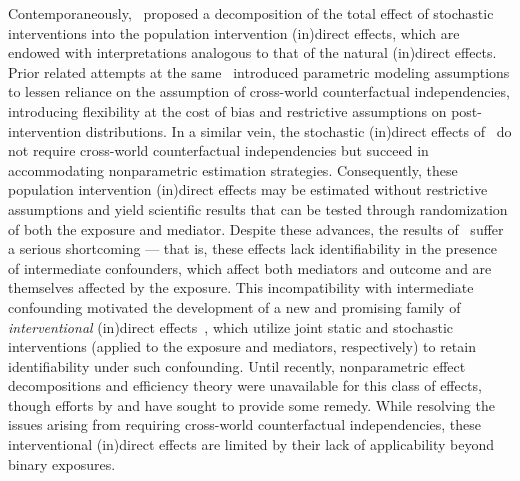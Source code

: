 Contemporaneously,~\citet{diaz2020causal} proposed a decomposition of the total
effect of stochastic interventions into the population intervention (in)direct
effects, which are endowed with interpretations analogous to that of the natural
(in)direct effects. Prior related attempts at the
same~\citep[e.g.,][]{vansteelandt2012imputation} introduced parametric modeling
assumptions to lessen reliance on the assumption of cross-world counterfactual
independencies, introducing flexibility at the cost of bias and restrictive
assumptions on post-intervention distributions. In a similar vein, the
stochastic (in)direct effects of~\citet{diaz2020causal} do not require
cross-world counterfactual independencies but succeed in accommodating
nonparametric estimation strategies. Consequently, these population intervention
(in)direct effects may be estimated without restrictive assumptions and yield
scientific results that can be tested through randomization of both the
exposure and mediator. Despite these advances, the results
of~\citet{diaz2020causal} suffer a serious shortcoming --- that is, these
effects lack identifiability in the presence of intermediate confounders, which
affect both mediators and outcome and are themselves affected by the exposure.
This incompatibility with intermediate confounding motivated the development of
a new and promising family of \textit{interventional} (in)direct
effects~\citep{didelez2006direct, vanderweele2014effect, lok2016defining,
vansteelandt2017interventional, zheng2017longitudinal, rudolph2017robust,
lok2019causal, nguyen2019clarifying}, which utilize joint static and stochastic
interventions (applied to the exposure and mediators, respectively) to retain
identifiability under such confounding. Until recently, nonparametric effect
decompositions and efficiency theory were unavailable for this class of effects,
though efforts by \citet{diaz2020nonparametric} and
\citet{benkeser2020nonparametric} have sought to provide some remedy. While
resolving the issues arising from requiring cross-world counterfactual
independencies, these interventional (in)direct effects are limited by their
lack of applicability beyond binary exposures.

